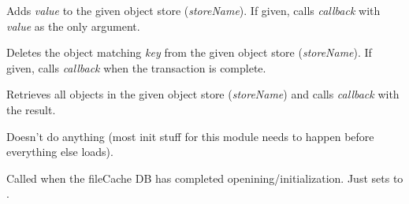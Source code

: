 \documentclass[letterpaper,10pt,openany]{sphinxmanual}
\begin{document}
\begin{fulllineitems}
\begin{fulllineitems}
\begin{fulllineitems}
\begin{fulllineitems}
\end{fulllineitems}



\begin{fulllineitems}
\label{Developer/js_gateone:GateOne.Storage.dbObject.put}
Adds \emph{value} to the given object store (\emph{storeName}).  If given, calls \emph{callback} with \emph{value} as the only argument.

\end{fulllineitems}



\begin{fulllineitems}
\label{Developer/js_gateone:GateOne.Storage.dbObject.del}
Deletes the object matching \emph{key} from the given object store (\emph{storeName}).  If given, calls \emph{callback} when the transaction is complete.

\end{fulllineitems}



\begin{fulllineitems}
\label{Developer/js_gateone:GateOne.Storage.dbObject.dump}
Retrieves all objects in the given object store (\emph{storeName}) and calls \emph{callback} with the result.

\end{fulllineitems}


\end{fulllineitems}



\begin{fulllineitems}
\label{Developer/js_gateone:GateOne.Storage.init}
Doesn't do anything (most init stuff for this module needs to happen before everything else loads).

\end{fulllineitems}



\begin{fulllineitems}
\label{Developer/js_gateone:GateOne.Storage.cacheReady}
Called when the fileCache DB has completed openining/initialization.  Just sets  to .


\end{fulllineitems}
\end{fulllineitems}
\end{fulllineitems}
\end{document}
